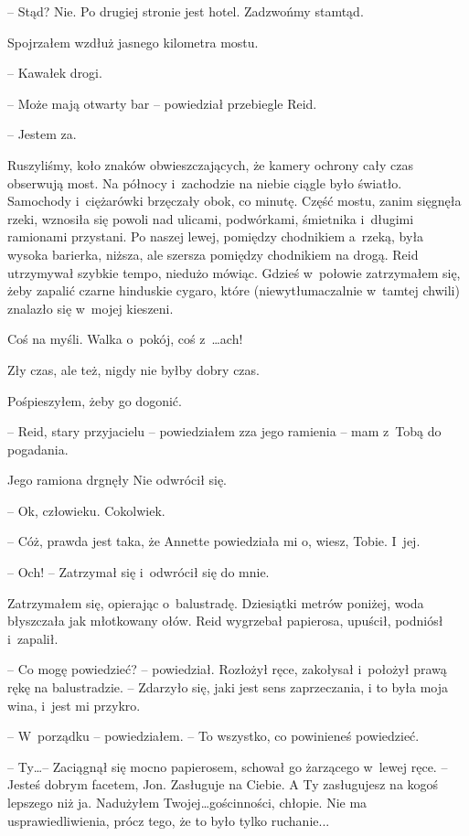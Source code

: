\documentclass[oneside,polish,11pt,sfheadings]{mwbk}
\begin{document}
-- Stąd? Nie. Po drugiej stronie jest hotel. Zadzwońmy stamtąd.

Spojrzałem wzdłuż jasnego kilometra mostu.

-- Kawałek drogi.

-- Może mają otwarty bar -- powiedział przebiegle Reid.

-- Jestem za.

Ruszyliśmy, koło znaków obwieszczających, że kamery ochrony cały czas
obserwują most. Na północy i~zachodzie na niebie ciągle było światło.
Samochody i~ciężarówki brzęczały obok, co minutę. Część mostu, zanim
sięgnęła rzeki, wznosiła się powoli nad ulicami, podwórkami, śmietnika i~długimi ramionami przystani. Po naszej lewej, pomiędzy chodnikiem a~rzeką, była wysoka barierka, niższa, ale szersza pomiędzy chodnikiem na
drogą. Reid utrzymywał szybkie tempo, niedużo mówiąc. Gdzieś w~połowie
zatrzymałem się, żeby zapalić czarne hinduskie cygaro, które
(niewytłumaczalnie w~tamtej chwili) znalazło się w~mojej kieszeni.

Coś na myśli. Walka o~pokój, coś z~\ldots ach!

Zły czas, ale też, nigdy nie byłby dobry czas.

Pośpieszyłem, żeby go dogonić.

-- Reid, stary przyjacielu -- powiedziałem zza jego ramienia -- mam z~Tobą
do pogadania.

Jego ramiona drgnęły Nie odwrócił się. 

-- Ok, człowieku. Cokolwiek.

-- Cóż, prawda jest taka, że Annette powiedziała mi o, wiesz, Tobie. I~jej.

-- Och! -- Zatrzymał się i~odwrócił się do mnie.

Zatrzymałem się, opierając o~balustradę. Dziesiątki metrów poniżej, woda
błyszczała jak młotkowany ołów. Reid wygrzebał papierosa, upuścił,
podniósł i~zapalił.

-- Co mogę powiedzieć? -- powiedział. Rozłożył ręce, zakołysał i~położył
prawą rękę na balustradzie. -- Zdarzyło się, jaki jest sens zaprzeczania,
i to była moja wina, i~jest mi przykro.

-- W~porządku -- powiedziałem. -- To wszystko, co powinieneś powiedzieć.

-- Ty\ldots -- Zaciągnął się mocno papierosem, schował go żarzącego w~lewej
ręce. -- Jesteś dobrym facetem, Jon. Zasługuje na Ciebie. A Ty
zasługujesz na kogoś lepszego niż ja. Nadużyłem Twojej\ldots gościnności,
chłopie. Nie ma usprawiedliwienia, prócz tego, że to było tylko
ruchanie...
\end{document}
